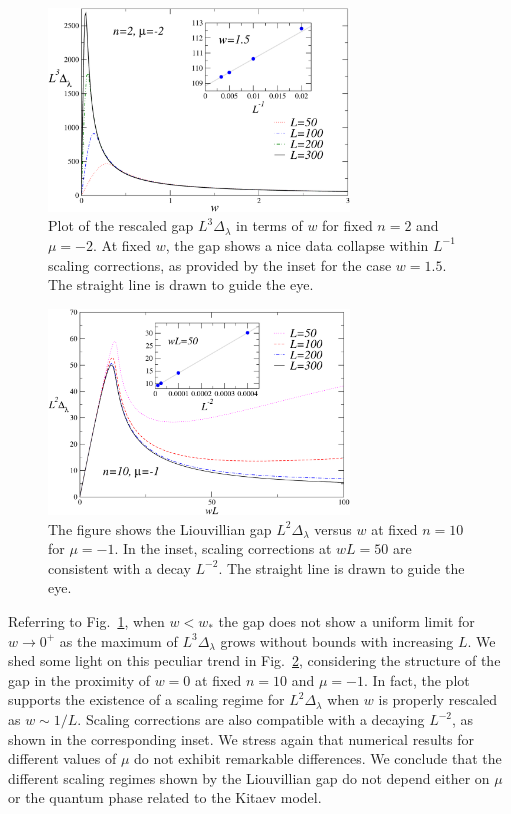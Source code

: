 \begin{figure}[!t]
    \centering
    \includegraphics[width=8cm]{imm/delantipk0bl2L3Dw.pdf}
    \caption{Plot of the rescaled gap $L^3\Delta_\lambda$ in terms of $w$ for fixed $n=2$ and $\mu=-2$.  At fixed $w$, the gap shows a nice data collapse within $L^{-1}$ scaling corrections, as provided by the inset for the case $w=1.5$. The straight line is drawn to guide the eye.}
    \label{fig_rescaleddelta_apbc_nfixed}
\end{figure}

\begin{figure}[!b]
    \centering
    \includegraphics[width=8cm]{imm/scalingDeltanfixedmuminus1.pdf}
    \caption{The figure shows the Liouvillian gap $L^2\Delta_\lambda$ versus $w$ at fixed $n=10$ for $\mu=-1$. In the inset, scaling corrections at $wL=50$ are consistent with a decay $L^{-2}$. The straight line is drawn to guide the eye.}
    \label{fig_scalingDeltanfixed}
\end{figure}

Referring to Fig.~\ref{fig_rescaleddelta_apbc_nfixed}, when $w<w_*$ the gap does not show a uniform limit for $w\to0^+$ as the maximum of $L^3\Delta_\lambda$ grows without bounds with increasing $L$. We shed some light on this peculiar trend in Fig.~\ref{fig_scalingDeltanfixed}, considering the structure of the gap in the proximity of $w=0$ at fixed $n=10$ and $\mu=-1$. In fact, the plot supports the existence of a scaling regime for $L^2\Delta_\lambda$ when $w$ is properly rescaled as $w \sim 1/L$. Scaling corrections are also compatible with a decaying $L^{-2}$, as shown in the corresponding inset. We stress again that numerical results for different values of $\mu$ do not exhibit remarkable differences. We conclude that the different scaling regimes shown by the Liouvillian gap do not depend either on $\mu$ or the quantum phase related to the Kitaev model.


